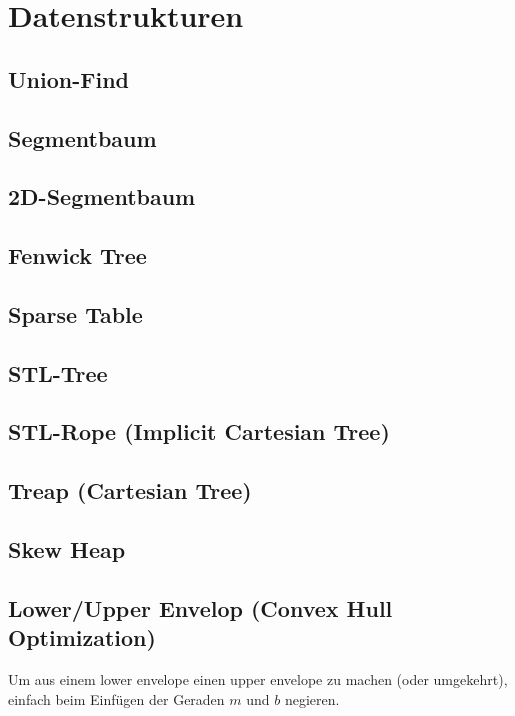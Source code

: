 \section{Datenstrukturen}

\subsection{Union-Find}


\subsection{Segmentbaum}


\subsection{2D-Segmentbaum}


\subsection{Fenwick Tree}



\subsection{Sparse Table}


\subsection{STL-Tree}


\subsection{STL-Rope (Implicit Cartesian Tree)}


\subsection{Treap (Cartesian Tree)}


\subsection{Skew Heap}


\subsection{Lower/Upper Envelop (Convex Hull Optimization)}
Um aus einem lower envelope einen upper envelope zu machen (oder umgekehrt), einfach beim Einfügen der Geraden $m$ und $b$ negieren.


